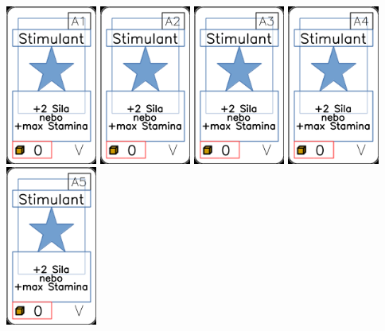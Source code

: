 \documentclass[a4paper]{article}
\begin{document}
	\includegraphics[width=3.0cm]{img-1_60}
	\includegraphics[width=3.0cm]{img-1_61}
	\includegraphics[width=3.0cm]{img-1_62}
	\includegraphics[width=3.0cm]{img-1_63}
	\includegraphics[width=3.0cm]{img-1_64}
\end{document}
